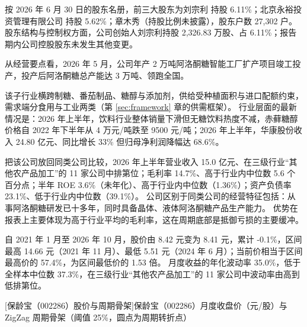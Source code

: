  按 2026 年 6 月 30 日的股东名册，前三大股东为刘宗利 持股 6.11\%；北京永裕投资管理有限公司 持股 5.62\%；章木秀（持股比例未披露），股东户数 27,302 户。 股东结构与控制权方面，公司创始人刘宗利持股 2,326.83 万股、占 6.11\%；报告期内公司控股股东未发生其他变更。

 从经营要点看，2026 年 5 月，公司年产 2 万吨阿洛酮糖智能工厂扩产项目竣工投产，投产后阿洛酮糖总产能达 3 万吨、领跑全国。

 该子行业横跨制糖、番茄制品、糖醇与添加剂，供给受种植面积与进口配额约束，需求端分食用与工业两类（第 \ref{sec:framework} 章的供需框架）。 行业层面的最新情况是：2026 年上半年，饮料行业整体销量下滑但无糖饮料热度不减，赤藓糖醇价格自 2022 年下半年从 4 万元/吨跌至 9500 元/吨；2026 年上半年，华康股份收入 24.80 亿元、同比增长 33\% 但归母净利润降幅达 68.6\%。

 把该公司放回同类公司比较，2026 年上半年营业收入 15.0 亿元、在三级行业“其他农产品加工”的 11 家公司中排第位；毛利率 14.7\%、高于行业内中位数 5.6 个百分点；半年 ROE 3.6\%（未年化）、高于行业内中位数（1.36\%）；资产负债率 23.1\%、低于行业内中位数（39.1\%）。 公司区别于同类公司的经营特征包括：从事阿洛酮糖研发已十多年，同时具备晶体、液体阿洛酮糖产品生产能力。 优势在报表上主要体现为高于行业平均的毛利率，这在周期底部是抵御亏损的主要缓冲。

 自 2021 年 1 月至 2026 年 10 月，股价由 8.42 元变为 8.41 元，累计 -0.1\%，区间最高 14.66 元（2021 年 11 月）、最低 5.51 元（2024 年 6 月）；当前价相当于区间最高价的 57.4\%，为区间最低价的 1.53 倍。 月度收益的年化波动率 35.0\%，低于全样本中位数 37.3\%，在三级行业“其他农产品加工”的 11 家公司中波动率由高到低排第位。

\begin{center}
\begin{minipage}{\textwidth}\centering
{}

[保龄宝（002286）股价与周期骨架]{保龄宝（002286）月度收盘价（元/股）与 ZigZag 周期骨架（阈值 25\%，圆点为周期转折点）}
\end{minipage}
\end{center}

